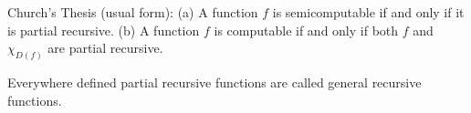 Church's Thesis (usual form):
(a) A function $f$ is semicomputable if and only if it is partial recursive.
(b) A function $f$ is computable if and only if both $f$ and $\chi_{D(f)}$ are partial recursive.

Everywhere defined partial recursive functions are called general recursive functions.